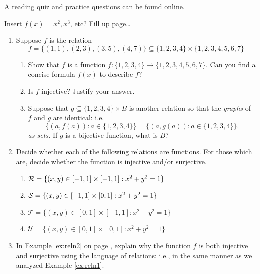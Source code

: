 \begin{exercises}{}{}
	A reading quiz and practice questions can be found \href{http://www.math.uci.edu/~ndonalds/math13/selftest/7-2-functions.html}{online}.

Insert $f(x)=x^2,x^3$, etc? Fill up page\ldots

\begin{enumerate}
  \item Suppose $f$ is the relation
  \[
  	f=\bigl\{(1,1),(2,3),(3,5),(4,7)\bigr\} \subseteq\{1,2,3,4\}\times\{1,2,3,4,5,6,7\}
  \]
  \begin{enumerate}
    \item Show that $f$ is a function $f:\{1,2,3,4\}\to\{1,2,3,4,5,6,7\}$. Can you find a concise formula $f(x)$ to describe $f$?
    \item Is $f$ injective? Justify your answer.
    \item Suppose that $g\subseteq\{1,2,3,4\}\times B$ is another relation so that the \emph{graphs} of $f$ and $g$ are identical: i.e.
    \[\bigl\{(a,f(a)):a\in\{1,2,3,4\}\bigr\}=\bigl\{(a,g(a)):a\in\{1,2,3,4\}\bigr\}.\] \emph{as sets.} If $g$ is a bijective function, what is $B$?
  \end{enumerate}
  
  \item Decide whether each of the following relations are functions. For those which are, decide whether the function is injective and/or surjective.
  \begin{enumerate}
    \item $\mathcal{R}=\{(x,y)\in[-1,1]\times[-1,1]:x^2+y^2=1\}$
    \item $\mathcal{S}=\{(x,y)\in[-1,1]\times[0,1]:x^2+y^2=1\}$
    \item $\mathcal T=\{(x,y)\in[0,1]\times[-1,1]:x^2+y^2=1\}$
    \item $\mathcal U=\{(x,y)\in[0,1]\times[0,1]:x^2+y^2=1\}$
  \end{enumerate}
  
  \item In Example \ref{ex:reln2} on page \pageref{ex:reln2}, explain why the function $f$ is both injective and surjective using the language of relations: i.e., in the same manner as we analyzed Example \ref{ex:reln1}.
  
  

\end{enumerate}
\end{exercises}
